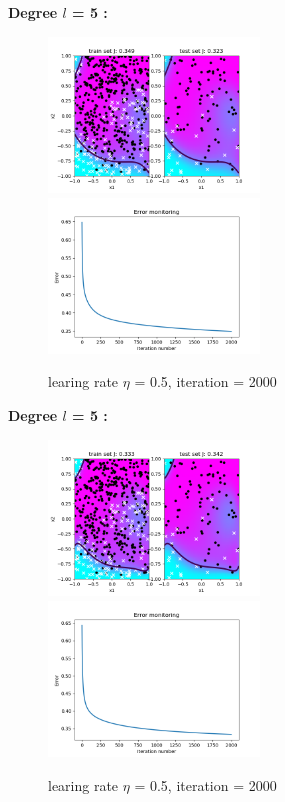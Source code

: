 \documentclass[a4paper]{article}
\begin{document}
\textbf{Degree $l$ = 5 :}\\
\begin{figure}[h]
	\includegraphics[width=0.5\textwidth]{best_fit_degree5.png}
	\includegraphics[width=0.5\textwidth]{best_fit_degree5_error.png}
	\caption{learing rate $\eta$ = 0.5, iteration = 2000}
\end{figure}
\textbf{Degree $l$ = 5 :}\\
\begin{figure}[h]
	\includegraphics[width=0.5\textwidth]{best_fit_degree15.png}
	\includegraphics[width=0.5\textwidth]{best_fit_degree15_error.png}
	\caption{learing rate $\eta$ = 0.5, iteration = 2000}
\end{figure}
\end{document}
